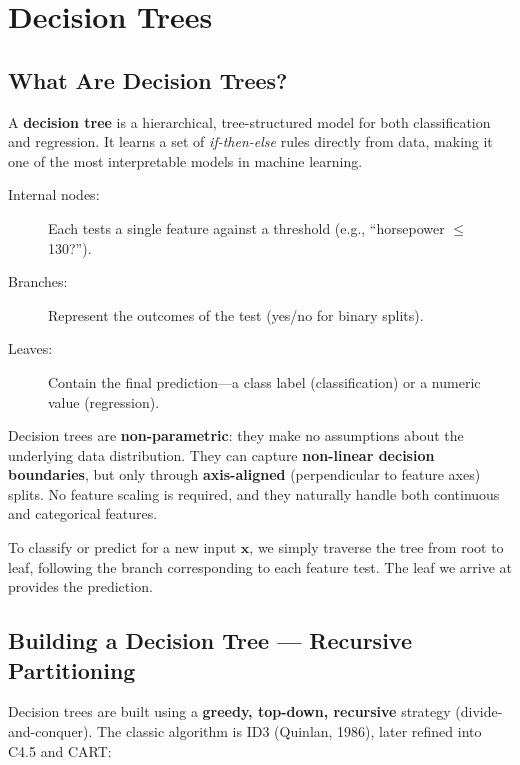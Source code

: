 \chapter*{Decision Trees}

\section*{What Are Decision Trees?}

A \textbf{decision tree} is a hierarchical, tree-structured model for both classification and regression. It learns a set of \textit{if-then-else} rules directly from data, making it one of the most interpretable models in machine learning.

\begin{description}
    \item[Internal nodes:] Each tests a single feature against a threshold (e.g., ``horsepower $\leq$ 130?'').
    \item[Branches:] Represent the outcomes of the test (yes/no for binary splits).
    \item[Leaves:] Contain the final prediction---a class label (classification) or a numeric value (regression).
\end{description}

\begin{remark}
Decision trees are \textbf{non-parametric}: they make no assumptions about the underlying data distribution. They can capture \textbf{non-linear decision boundaries}, but only through \textbf{axis-aligned} (perpendicular to feature axes) splits. No feature scaling is required, and they naturally handle both continuous and categorical features.
\end{remark}

To classify or predict for a new input $\mathbf{x}$, we simply traverse the tree from root to leaf, following the branch corresponding to each feature test. The leaf we arrive at provides the prediction.

\section*{Building a Decision Tree --- Recursive Partitioning}

Decision trees are built using a \textbf{greedy, top-down, recursive} strategy (divide-and-conquer). The classic algorithm is ID3 (Quinlan, 1986), later refined into C4.5 and CART:

